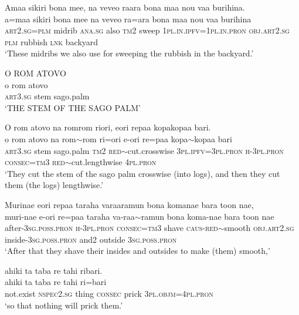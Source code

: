 \ea\label{ex:text2-22}
Amaa sikiri bona mee, na veveo raara bona maa nou vaa burihina.\\
\gll a=maa	sikiri	bona	mee	na	veveo	ra=ara	bona	maa	nou	vaa	burihina\\
     \textsc{art}2.\textsc{sg}=\textsc{plm}	midrib	\textsc{ana}.\textsc{sg}	also	\textsc{tm}2	sweep	1\textsc{pl}.\textsc{in}.\textsc{ipfv}=1\textsc{pl}.\textsc{in}.\textsc{pron}	\textsc{obj}.\textsc{art}2.\textsc{sg}	\textsc{plm}	rubbish	\textsc{lnk}	backyard\\
\glt `These midribs we also use for sweeping the rubbish in the backyard.'
\z

\ea\label{ex:text2-23}
O ROM ATOVO\\
\gll o	rom	atovo\\
     \textsc{art}3.\textsc{sg}	stem	sago.palm\\
\glt `THE STEM OF THE SAGO PALM'
\z

\ea\label{ex:text2-24}
O rom atovo na romrom riori, eori repaa kopakopaa bari.\\
\gll o	rom	atovo	na	rom{$\sim$}rom	ri=ori	e-ori	re=paa	kopa{$\sim$}kopaa	bari\\
     \textsc{art}3.\textsc{sg}	stem	sago.palm	\textsc{tm}2	\textsc{red}{$\sim$}cut.crosswise	3\textsc{pl}.\textsc{ipfv}=3\textsc{pl}.\textsc{pron}	\textsc{h}-3\textsc{pl}.\textsc{pron}	\textsc{consec}=\textsc{tm}3	\textsc{red}{$\sim$}cut.lengthwise	4\textsc{pl}.\textsc{pron}\\
\glt `They cut the stem of the sago palm crosswise (into logs), and then they cut them (the logs) lengthwise.'
\z

\ea\label{ex:text2-25}
Murinae eori repaa taraha varaaramun bona komanae bara toon nae,\\
\gll muri-nae	e-ori	re=paa	taraha	va-raa{$\sim$}ramun	bona	koma-nae	bara	toon	nae\\
     after-3\textsc{sg}.\textsc{poss}.\textsc{pron}	\textsc{h}-3\textsc{pl}.\textsc{pron}	\textsc{consec}=\textsc{tm}3	shave	\textsc{caus}-\textsc{red}{$\sim$}smooth	\textsc{obj}.\textsc{art}2.\textsc{sg}	inside-3\textsc{sg}.\textsc{poss}.\textsc{pron}	and2	outside	3\textsc{sg}.\textsc{poss}.\textsc{pron}\\
\glt `After that they shave their insides and outsides to make (them) smooth,'
\z

\ea\label{ex:text2-26}
ahiki ta taba re tahi ribari.\\
\gll ahiki	ta	taba	re	tahi	ri=bari\\
     not.exist	\textsc{nspec}2.\textsc{sg}	thing	\textsc{consec}	prick	3\textsc{pl}.\textsc{objm}=4\textsc{pl}.\textsc{pron}\\
\glt `so that nothing will prick them.'
\z

